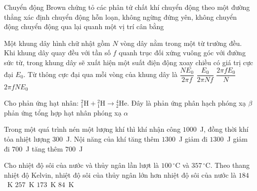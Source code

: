 	\begin{ex}%
		Chuyển động Brown chứng tỏ các phân tử chất khí
		\choice
		{chuyển động theo một đường thẳng xác định}
		{\True chuyển động hỗn loạn, không ngừng}
		{đứng yên, không chuyển động}
		{chuyển động qua lại quanh một vị trí cân bằng}
	\end{ex}

	\begin{ex}%
		Một khung dây hình chữ nhật gồm $N$ vòng dây nằm trong một từ trường đều. Khi khung dây quay đều với tần số $f$ quanh trục đối xứng vuông góc với đường sức từ, trong khung dây sẽ xuất hiện một suất điện động xoay chiều có giá trị cực đại $E_0$. Từ thông cực đại qua mỗi vòng của khung dây là
		\choice
		{$\dfrac{NE_0}{2\pi f}$}
		{\True $\dfrac{E_0}{2\pi Nf}$}
		{$\dfrac{2\pi fE_0}{N}$}
		{$2\pi fNE_0$}
	\end{ex}

	\begin{ex}%
		Cho phản ứng hạt nhân: ${}^2_1\text{H}+{}^2_1\text{H}\to{}^4_2\text{He}$. Đây là
		\choice
		{phản ứng phân hạch}
		{phóng xạ $\beta$}
		{\True phản ứng tổng hợp hạt nhân}
		{phóng xạ $\alpha$}
	\end{ex}

	\begin{ex}%
		Trong một quá trình nén một lượng khí thì khí nhận công $1000$~J, đồng thời khí tỏa nhiệt lượng $300$~J. Nội năng của khí
		\choice
		{tăng thêm $1300$~J}
		{giảm đi $1300$~J}
		{giảm đi $700$~J}
		{\True tăng thêm $700$~J}
	\end{ex}

	\begin{ex}%
		Cho nhiệt độ sôi của nước và thủy ngân lần lượt là $100\,^\circ\text{C}$ và $357\,^\circ\text{C}$. Theo thang nhiệt độ Kelvin, nhiệt độ sôi của thủy ngân lớn hơn nhiệt độ sôi của nước là
		\choice
		{$184$~K}
		{\True $257$~K}
		{$173$~K}
		{$84$~K}
	\end{ex}

